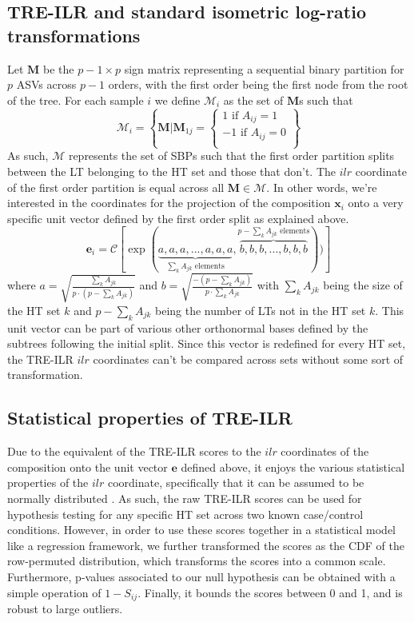 \documentclass{article}
\begin{document}
\subsection{TRE-ILR and standard isometric log-ratio transformations}
\noindent Let $\bm M$ be the $p-1 \times p$ sign matrix representing a sequential binary partition for $p$ ASVs across $p-1$ orders, with the first order being the first node from the root of the tree. For each sample $i$ we define $\mathcal{M}_i$ as the set of $\bm M$s such that 
\[ \mathcal{M}_i = \left\{\bm{M} | \bm{M}_{1j} = \begin{cases}
    1 \text{ if } A_{ij} = 1\\
    -1 \text{ if } A_{ij} = 0\\ 
\end{cases}
\right \}
\]
As such, $\mathcal{M}$ represents the set of SBPs such that the first order partition splits between the LT belonging to the HT set and those that don't. The $ilr$ coordinate of the first order partition is equal across all $\bm{M} \in \mathcal{M}$. In other words, we're interested in the coordinates for the projection of the composition $\bm{x}_{i}$ onto a very specific unit vector defined by the first order split as explained above.  
\[\bm{e}_i = \mathcal{C}[\exp(\underbrace{a, a, a,..., a, a, a}_{\sum_k A_{jk} \text{ elements}},\overbrace{b,b,b,...,b,b,b}^{p - \sum_k A_{jk} \text{ elements}}))] \]  
where $a = \sqrt{\frac{\sum_k A_{jk}}{p \cdot (p - \sum_k A_{jk})}}$ and $b = \sqrt{\frac{-(p - \sum_k A_{jk})}{p \cdot \sum_k A_{jk}}}$ with $\sum_k A_{jk}$ being the size of the HT set $k$ and $p - \sum_k A_{jk}$ being the number of LTs not in the HT set $k$. This unit vector can be part of various other orthonormal bases defined by the subtrees following the initial split. Since this vector is redefined for every HT set, the TRE-ILR $ilr$ coordinates can't be compared across sets without some sort of transformation.  
 
\subsection{Statistical properties of TRE-ILR}
Due to the equivalent of the TRE-ILR scores to the $ilr$ coordinates of the composition onto the unit vector $\bm{e}$ defined above, it enjoys the various statistical properties of the $ilr$ coordinate, specifically that it can be assumed to be normally distributed \cite{egozcue2003,egozcue2005}. As such, the raw TRE-ILR scores can be used for hypothesis testing for any specific HT set across two known case/control conditions. However, in order to use these scores together in a statistical model like a regression framework, we further transformed the scores as the CDF of the row-permuted distribution, which transforms the scores into a common scale. Furthermore, p-values associated to our null hypothesis can be obtained with a simple operation of $1 - S_{ij}$. Finally, it bounds the scores between 0 and 1, and is robust to large outliers.  
\end{document}
